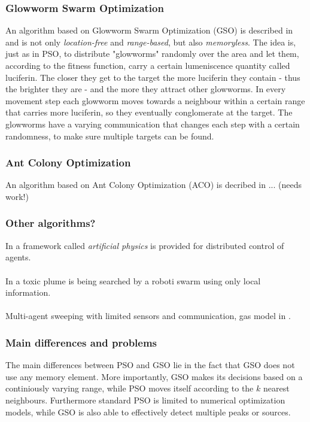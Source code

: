 \subsubsection{Glowworm Swarm Optimization}
	An algorithm based on Glowworm Swarm Optimization (GSO) is described in \cite{krishnanand2006glowworm} and is not only \emph{location-free} and \emph{range-based}, but also \emph{memoryless}. The idea is, just as in PSO, to distribute "glowworms" randomly over the area and let them, according to the fitness function, carry a certain lumeniscence quantity called luciferin. The closer they get to the target the more luciferin they contain - thus the brighter they are - and the more they attract other glowworms. In every movement step each glowworm moves towards a neighbour within a certain range that carries more luciferin, so they eventually conglomerate at the target. The glowworms have a varying communication that changes each step with a certain randomness, to make sure multiple targets can be found.

\subsubsection{Ant Colony Optimization}
	An algorithm based on Ant Colony Optimization (ACO) is decribed in ... (needs work!)\\

\subsubsection{Other algorithms?}
	In \cite{zarzhitsky2005agent} a framework called \emph{artificial physics} is provided for distributed control of agents.\\
	\\
	In \cite{zarzhitsky2005distributed} a toxic plume is being searched by a roboti swarm using only local information. \\
	\\
	Multi-agent sweeping with limited sensors and communication, gas model in \cite{kerr2005two}.

\subsubsection{Main differences and problems}
	The main differences between PSO and GSO lie in the fact that GSO does not use any memory element. More importantly, GSO makes its decisions based on a continiously varying range, while PSO moves itself according to the $k$ nearest neighbours. Furthermore standard PSO is limited to numerical optimization models, while GSO is also able to effectively detect multiple peaks or sources.